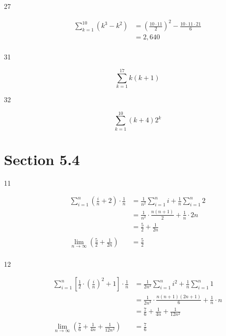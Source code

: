 \documentclass{exam}
\begin{document}
\begin{description}
\item[27]
\begin{align*}
  \sum_{k = 1}^{10} (k^3 - k^2) &= \left( \frac{10 \cdot 11}{2} \right)^2 - \frac{10 \cdot 11 \cdot 21}{6} \\
  &= 2,640 \\
\end{align*}

\item[31]
\[
  \sum_{k = 1}^{17} k (k + 1)
\]

\item[32]
\[
  \sum_{k = 1}^{10} (k + 4) 2^k
\]

\end{description}

\pagebreak

\section{Section 5.4}

\begin{description}

\item[11]
\begin{align*}
  \sum_{i = 1}^n \left( \frac{i}{n} + 2 \right) \cdot \frac{1}{n} &= \frac{1}{n^2} \sum_{i = 1}^n i + \frac{1}{n} \sum_{i = 1}^n 2 \\
  &= \frac{1}{n^2} \cdot \frac{n(n+1)}{2} + \frac{1}{n} \cdot 2n \\
  &= \frac{5}{2} + \frac{1}{2n} \\
\\
  \lim_{n \to \infty} \left( \frac{5}{2} + \frac{1}{2n} \right) &= \frac{5}{2} \\
\end{align*}

\item[12]
\begin{align*}
  \sum_{i = 1}^n \left[ \frac{1}{2} \cdot \left( \frac{i}{n} \right)^2 + 1 \right] \cdot \frac{1}{n} &= \frac{1}{2n^3} \sum_{i = 1}^n i^2 + \frac{1}{n} \sum_{i = 1}^n 1 \\
  &= \frac{1}{2n^3} \cdot \frac{n(n + 1)(2n +1)}{6} + \frac{1}{n} \cdot n \\ 
  &= \frac{7}{6} + \frac{1}{4n} + \frac{1}{12n^2} \\
\\
  \lim_{n \to \infty} \left( \frac{7}{6} + \frac{1}{4n} + \frac{1}{12n^2} \right) &= \frac{7}{6} \\
\end{align*}


\end{description}
\end{document}

